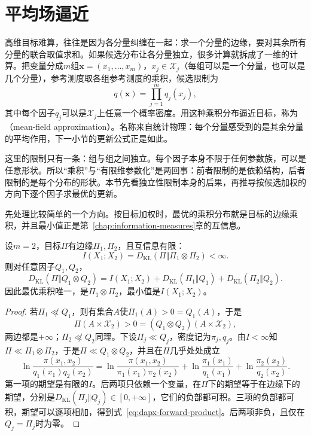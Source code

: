 \section{平均场逼近}
\label{sec:dapx-mean-field}

高维目标难算，往往是因为各分量纠缠在一起：求一个分量的边缘，要对其余所有分量的联合取值求和。如果候选分布让各分量独立，很多计算就拆成了一维的计算。把变量分成$m$组$\bm{x}=(x_1,\dots,x_m)$，$x_j\in\mathcal{X}_j$（每组可以是一个分量，也可以是几个分量），参考测度取各组参考测度的乘积，候选限制为
\begin{equation}
 q(\bm{x})=\prod_{j=1}^{m}q_j(x_j) ,
 \label{eq:dapx-product}
\end{equation}
其中每个因子$q_j$可以是$\mathcal{X}_j$上任意一个概率密度。用这种乘积分布逼近目标，称为（mean-field approximation）。名称来自统计物理：每个分量感受到的是其余分量的平均作用，下一小节的更新公式正是如此。

这里的限制只有一条：组与组之间独立。每个因子本身不限于任何参数族，可以是任意形状。所以“乘积”与“有限维参数化”是两回事：前者限制的是依赖结构，后者限制的是每个分布的形状。本节先看独立性限制本身的后果，再推导按候选加权的方向下逐个因子求最优的更新。

先处理比较简单的一个方向。按目标加权时，最优的乘积分布就是目标的边缘乘积，并且最小值正是第~\ref{chap:information-measures}章的互信息。

\begin{lemma}[正向KL下的最优乘积]
\label{lem:dapx-forward-product}
设$m=2$，目标$\Pi$有边缘$\Pi_1,\Pi_2$，且互信息有限：
\begin{equation}
 I(X_1;X_2)=D_{\mathrm{KL}}(\Pi\Vert\Pi_1\otimes\Pi_2)<\infty .
 \label{eq:dapx-mi-finite}
\end{equation}
则对任意因子$Q_1,Q_2$，
\begin{equation}
 D_{\mathrm{KL}}(\Pi\Vert Q_1\otimes Q_2)=I(X_1;X_2)+D_{\mathrm{KL}}(\Pi_1\Vert Q_1)+D_{\mathrm{KL}}(\Pi_2\Vert Q_2) .
 \label{eq:dapx-forward-product}
\end{equation}
因此最优乘积唯一，是$\Pi_1\otimes\Pi_2$，最小值是$I(X_1;X_2)$。
\end{lemma}

\begin{proof}
若$\Pi_1\not\ll Q_1$，则有集合$A$使$\Pi_1(A)>0=Q_1(A)$，于是
\[
 \Pi(A\times\mathcal{X}_2)>0=(Q_1\otimes Q_2)(A\times\mathcal{X}_2) ,
\]
两边都是$+\infty$；$\Pi_2\not\ll Q_2$同理。下设$\Pi_j\ll Q_j$，密度记为$\pi_j,q_j$。由$I<\infty$知$\Pi\ll\Pi_1\otimes\Pi_2$，于是$\Pi\ll Q_1\otimes Q_2$，并且在$\Pi$几乎处处成立
\[
 \ln\frac{\pi(x_1,x_2)}{q_1(x_1)q_2(x_2)}=\ln\frac{\pi(x_1,x_2)}{\pi_1(x_1)\pi_2(x_2)}+\ln\frac{\pi_1(x_1)}{q_1(x_1)}+\ln\frac{\pi_2(x_2)}{q_2(x_2)} .
\]
第一项的期望是有限的$I$。后两项只依赖一个变量，在$\Pi$下的期望等于在边缘下的期望，分别是$D_{\mathrm{KL}}(\Pi_j\Vert Q_j)\in[0,+\infty]$，它们的负部都可积。三项的负部都可积，期望可以逐项相加，得到式~\eqref{eq:dapx-forward-product}。后两项非负，且仅在$Q_j=\Pi_j$时为零。
\end{proof}

